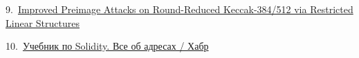 \documentclass[a4paper,12pt]{article}
\theoremstyle{plain} %
\theoremstyle{definition} %
\theoremstyle{remark} %
\begin{document}
	9.\
	\href{https://docs.yandex.ru/docs/view?tm=1670582387&tld=ru&lang=en&name=788.pdf&text=Improved%20Preimage%20Attacks%20on%20Round-Reduced%20Keccak-384%2F512%20via%20Restricted%20Linear%20Structures&url=https%3A%2F%2Feprint.iacr.org%2F2022%2F788.pdf&lr=213&mime=pdf&l10n=ru&sign=d880f70fe33c1fb1f84165be0ce9440c&keyno=0&serpParams=tm%3D1670582387%26tld%3Dru%26lang%3Den%26name%3D788.pdf%26text%3DImproved%2BPreimage%2BAttacks%2Bon%2BRound-Reduced%2BKeccak-384%2F512%2Bvia%2BRestricted%2BLinear%2BStructures%26url%3Dhttps%253A%2F%2Feprint.iacr.org%2F2022%2F788.pdf%26lr%3D213%26mime%3Dpdf%26l10n%3Dru%26sign%3Dd880f70fe33c1fb1f84165be0ce9440c%26keyno%3D0}{Improved Preimage Attacks on Round-Reduced
		Keccak-384/512 via Restricted Linear Structures}
	
 10.\ 
 \href{https://habr.com/ru/post/572456/}{Учебник по Solidity. Все об адресах / Хабр}

	

	

	
	
	
	
	
\end{document}
